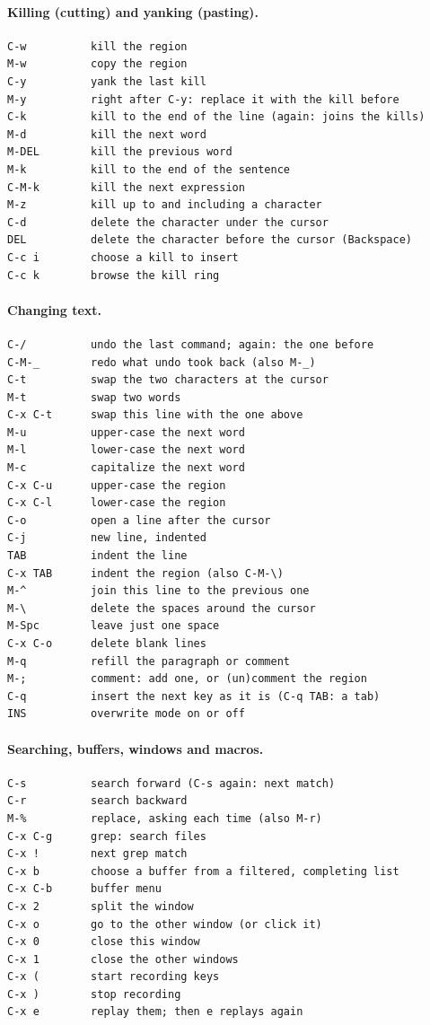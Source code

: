 \documentclass[a4paper,12pt,openany]{book}
\begin{document}
\paragraph{Killing (cutting) and yanking (pasting).}
\begin{verbatim}
C-w          kill the region
M-w          copy the region
C-y          yank the last kill
M-y          right after C-y: replace it with the kill before
C-k          kill to the end of the line (again: joins the kills)
M-d          kill the next word
M-DEL        kill the previous word
M-k          kill to the end of the sentence
C-M-k        kill the next expression
M-z          kill up to and including a character
C-d          delete the character under the cursor
DEL          delete the character before the cursor (Backspace)
C-c i        choose a kill to insert
C-c k        browse the kill ring
\end{verbatim}

\paragraph{Changing text.}
\begin{verbatim}
C-/          undo the last command; again: the one before
C-M-_        redo what undo took back (also M-_)
C-t          swap the two characters at the cursor
M-t          swap two words
C-x C-t      swap this line with the one above
M-u          upper-case the next word
M-l          lower-case the next word
M-c          capitalize the next word
C-x C-u      upper-case the region
C-x C-l      lower-case the region
C-o          open a line after the cursor
C-j          new line, indented
TAB          indent the line
C-x TAB      indent the region (also C-M-\)
M-^          join this line to the previous one
M-\          delete the spaces around the cursor
M-Spc        leave just one space
C-x C-o      delete blank lines
M-q          refill the paragraph or comment
M-;          comment: add one, or (un)comment the region
C-q          insert the next key as it is (C-q TAB: a tab)
INS          overwrite mode on or off
\end{verbatim}

\paragraph{Searching, buffers, windows and macros.}
\begin{verbatim}
C-s          search forward (C-s again: next match)
C-r          search backward
M-%          replace, asking each time (also M-r)
C-x C-g      grep: search files
C-x !        next grep match
C-x b        choose a buffer from a filtered, completing list
C-x C-b      buffer menu
C-x 2        split the window
C-x o        go to the other window (or click it)
C-x 0        close this window
C-x 1        close the other windows
C-x (        start recording keys
C-x )        stop recording
C-x e        replay them; then e replays again
\end{verbatim}
\end{document}
